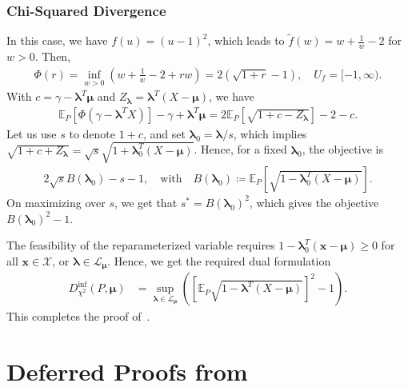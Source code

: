 \documentclass{article}
\theoremstyle{plain}
\theoremstyle{definition}
\newcommand{\lrp}[1]{\left( #1 \right)}
\newcommand{\calX}{\mathcal X}
\newcommand{\calL}{\mathcal L}
\newcommand{\xvec}{\mathbf{x}}
\newcommand{\qtext}[1]{\quad \text{#1} \quad}
\newcommand{\boldlambda}{\boldsymbol{\lambda}}
\newcommand{\boldmu}{\boldsymbol{\mu}}
\newcommand{\ftilde}{\widetilde{f}}
\begin{document}
\subsubsection{Chi-Squared Divergence}
\label{proof:corollary-Chi-squared}
    In this case, we have $f(u) = (u-1)^2$, which leads to $\ftilde(w) = w + \frac 1 w - 2$ for $w>0$. Then, 
    \begin{align}
        \Phi(r) = \inf_{w > 0} \lrp{ w + \frac 1 w - 2 + r w} = 2 \lrp{\sqrt{1+r} - 1},  \quad U_f = [-1, \infty). 
    \end{align}
    With $c = \gamma - \boldlambda^T \boldmu$ and $Z_{\boldlambda} = \boldlambda^T(X-\boldmu)$, we have 
    \begin{align}
        \mathbb{E}_P[\Phi(\gamma - \boldlambda^TX)]  - \gamma  + \boldlambda^T \boldmu = 2 \mathbb{E}_P[\sqrt{1 + c - Z_{\boldlambda}}] - 2 - c. 
    \end{align}
    Let us use $s$ to denote $1+c$, and set $\boldlambda_0 = \boldlambda/s$, which implies $\sqrt{1+c + Z_{\boldlambda}} = \sqrt{s} \sqrt{1 + \boldlambda_0^T(X-\boldmu)}$. Hence, for a fixed $\boldlambda_0$, the objective is 
    \begin{align}
        2 \sqrt{s} B(\boldlambda_0) - s - 1, \qtext{with} B(\boldlambda_0) \coloneqq \mathbb{E}_P[\sqrt{1- \boldlambda^T_0(X-\boldmu)}]. 
    \end{align}
    On maximizing over $s$, we get that $s^* = B(\boldlambda_0)^2$, which gives the objective $B(\boldlambda_0)^2 -1$. 

    The feasibility of the reparameterized variable requires $1-\boldlambda_0^T(\xvec-\boldmu) \geq 0$ for all $\xvec  \in \calX$, or $\boldlambda\in \calL_{\boldmu}$. Hence, we get the required dual formulation
    \begin{align}
        D_{\chi^2}^{\inf}(P, \boldmu)& = \sup_{\boldlambda \in \calL_{\boldmu}} \lrp{ \left[ \mathbb{E}_P \sqrt{1 - \boldlambda^T(X-\boldmu)} \right]^2 - 1 }. 
    \end{align}
    This completes the proof of~. \hfill \qedsymbol 




\section{Deferred Proofs from~}
\label{proof:general-limiting-argument}
\end{document}
